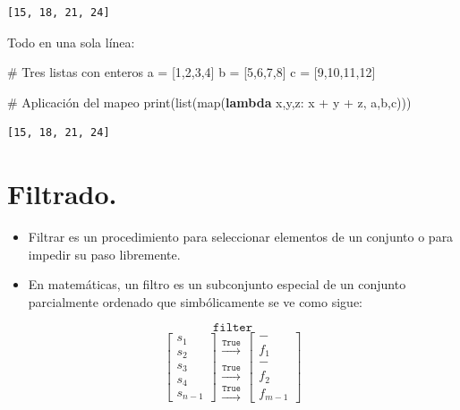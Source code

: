 \documentclass[
  spanish,
  letterpaper,
]{scrbook}
\newenvironment{Shaded}{\begin{snugshade}}{\end{snugshade}}
\newcommand{\BuiltInTok}[1]{\textcolor[rgb]{0.00,0.23,0.31}{#1}}
\newcommand{\CommentTok}[1]{\textcolor[rgb]{0.37,0.37,0.37}{#1}}
\newcommand{\DecValTok}[1]{\textcolor[rgb]{0.68,0.00,0.00}{#1}}
\newcommand{\KeywordTok}[1]{\textcolor[rgb]{0.00,0.23,0.31}{\textbf{#1}}}
\newcommand{\NormalTok}[1]{\textcolor[rgb]{0.00,0.23,0.31}{#1}}
\newcommand{\OperatorTok}[1]{\textcolor[rgb]{0.37,0.37,0.37}{#1}}
\theoremstyle{definition}
\theoremstyle{remark}
\begin{document}
\begin{verbatim}
[15, 18, 21, 24]
\end{verbatim}

Todo en una sola línea:

\begin{Shaded}
\begin{Highlighting}[]
\CommentTok{\# Tres listas con enteros}
\NormalTok{a }\OperatorTok{=}\NormalTok{ [}\DecValTok{1}\NormalTok{,}\DecValTok{2}\NormalTok{,}\DecValTok{3}\NormalTok{,}\DecValTok{4}\NormalTok{]}
\NormalTok{b }\OperatorTok{=}\NormalTok{ [}\DecValTok{5}\NormalTok{,}\DecValTok{6}\NormalTok{,}\DecValTok{7}\NormalTok{,}\DecValTok{8}\NormalTok{]}
\NormalTok{c }\OperatorTok{=}\NormalTok{ [}\DecValTok{9}\NormalTok{,}\DecValTok{10}\NormalTok{,}\DecValTok{11}\NormalTok{,}\DecValTok{12}\NormalTok{]}

\CommentTok{\# Aplicación del mapeo}
\BuiltInTok{print}\NormalTok{(}\BuiltInTok{list}\NormalTok{(}\BuiltInTok{map}\NormalTok{(}\KeywordTok{lambda}\NormalTok{ x,y,z: x }\OperatorTok{+}\NormalTok{ y }\OperatorTok{+}\NormalTok{ z, a,b,c)))}
\end{Highlighting}
\end{Shaded}

\begin{verbatim}
[15, 18, 21, 24]
\end{verbatim}

\section{Filtrado.}\label{filtrado.}

\begin{itemize}
\item
  Filtrar es un procedimiento para seleccionar elementos de un conjunto
  o para impedir su paso libremente.
\item
  En matemáticas, un filtro es un subconjunto especial de un conjunto
  parcialmente ordenado que simbólicamente se ve como sigue:
\end{itemize}

\[
\texttt{filter} 
\] \[
\left[
\begin{matrix}
s_1 \\ s_2 \\ s_3 \\ s_4 \\ s_{n-1} 
\end{matrix}
\right]
\begin{matrix}
\\ \xrightarrow{\texttt{True}} \\  \\ \xrightarrow{\texttt{True}}  \\ \xrightarrow{\texttt{True}}   
\end{matrix}
\left[
\begin{matrix}
- \\ f_1 \\ - \\ f_2 \\ f_{m-1} 
\end{matrix}
\right]
\]
\end{document}

